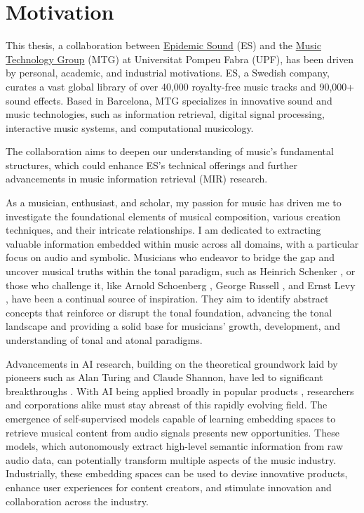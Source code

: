 \section{Motivation}

This thesis, a collaboration between \href{https://www.epidemicsound.com/}{Epidemic Sound} (ES) and the \href{https://www.upf.edu/web/mtg}{Music Technology Group} (MTG) at Universitat Pompeu Fabra (UPF), has been driven by personal, academic, and industrial motivations. ES, a Swedish company, curates a vast global library of over 40,000 royalty-free music tracks and 90,000+ sound effects. Based in Barcelona, MTG specializes in innovative sound and music technologies, such as information retrieval, digital signal processing, interactive music systems, and computational musicology.

The collaboration aims to deepen our understanding of music's fundamental structures, which could enhance ES's technical offerings and further advancements in music information retrieval (MIR) research.

As a musician, enthusiast, and scholar, my passion for music has driven me to investigate the foundational elements of musical composition, various creation techniques, and their intricate relationships. I am dedicated to extracting valuable information embedded within music across all domains, with a particular focus on audio and symbolic. Musicians who endeavor to bridge the gap and uncover musical truths within the tonal paradigm, such as Heinrich Schenker \cite{Komar1959SchenkersStructure}, or those who challenge it, like Arnold Schoenberg \cite{Samson1974SchoenbergsMusic}, George Russell \cite{LydianRussell}, and Ernst Levy \cite{LevyAHarmony}, have been a continual source of inspiration. They aim to identify abstract concepts that reinforce or disrupt the tonal foundation, advancing the tonal landscape and providing a solid base for musicians' growth, development, and understanding of tonal and atonal paradigms.

Advancements in AI research, building on the theoretical groundwork laid by pioneers such as Alan Turing and Claude Shannon, have led to significant breakthroughs \cite{Vaswani2017AttentionNeed}. With AI being applied broadly in popular products \cite{OpenAI2023GPT-4Report}, researchers and corporations alike must stay abreast of this rapidly evolving field. The emergence of self-supervised models capable of learning embedding spaces to retrieve musical content from audio signals presents new opportunities. These models, which autonomously extract high-level semantic information from raw audio data, can potentially transform multiple aspects of the music industry. Industrially, these embedding spaces can be used to devise innovative products, enhance user experiences for content creators, and stimulate innovation and collaboration across the industry.

